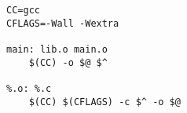 \begin{lstlisting}
CC=gcc
CFLAGS=-Wall -Wextra

main: lib.o main.o
    $(CC) -o $@ $^ 

%.o: %.c
    $(CC) $(CFLAGS) -c $^ -o $@\end{lstlisting}
